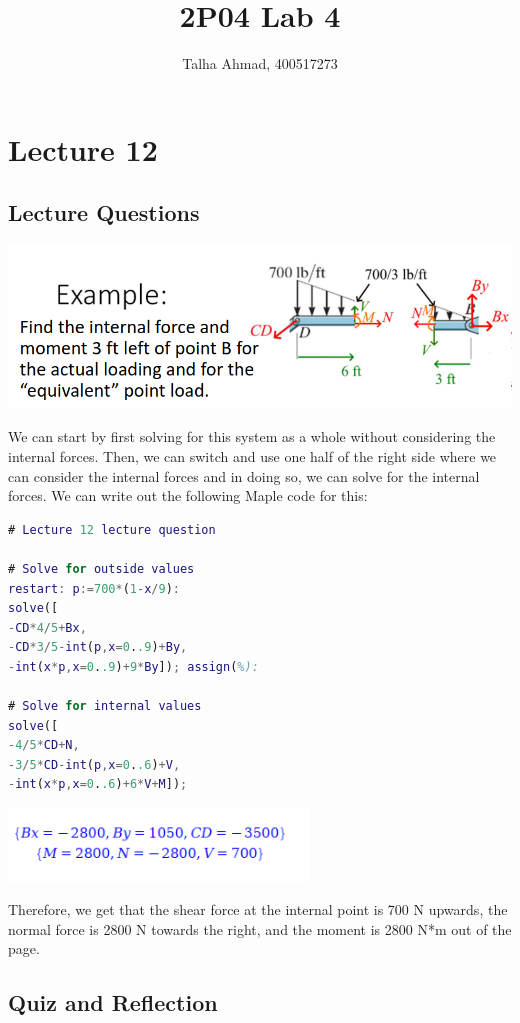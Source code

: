 \documentclass{article}[14pt, letterpaper, Times New Roman]
\title{2P04 Lab 4}
\author{Talha Ahmad, 400517273}
\begin{document}
\maketitle

\section{Lecture 12}

\subsection{Lecture Questions}

\includegraphics[width=15cm]{l12-lq.png}

We can start by first solving for this system as a whole without considering the internal forces.
Then, we can switch and use one half of the right side where we can consider the internal forces and in doing so, we can solve for the internal forces.
We can write out the following Maple code for this:

\begin{lstlisting}[language=matlab]
# Lecture 12 lecture question

# Solve for outside values
restart: p:=700*(1-x/9):
solve([
-CD*4/5+Bx,
-CD*3/5-int(p,x=0..9)+By,
-int(x*p,x=0..9)+9*By]); assign(%):

# Solve for internal values
solve([
-4/5*CD+N,
-3/5*CD-int(p,x=0..6)+V,
-int(x*p,x=0..6)+6*V+M]);
\end{lstlisting}

\includegraphics[width=8cm]{l12-lq-o.png}

Therefore, we get that the shear force at the internal point is 700 N upwards, the normal force is 2800 N towards the right, and the moment is 2800 N*m out of the page.

\subsection{Quiz and Reflection}
\end{document}
